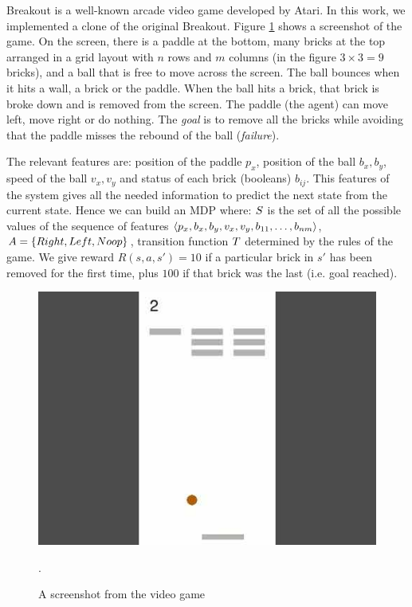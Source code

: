 \begin{example}\label{exa:breakout}
	Breakout is a well-known arcade video game developed by Atari. In this work, we implemented a clone of the original Breakout. Figure \ref{fig:breakout} shows a screenshot of the game. On the screen, there is a paddle at the bottom, many bricks at the top arranged in a grid layout with $n$ rows and $m$ columns (in the figure $3\times 3 = 9$ bricks), and a ball that is free to move across the screen. The ball bounces when it hits a wall, a brick or the paddle. When the ball hits a brick, that brick is broke down and is removed from the screen. The paddle (the agent) can move left, move right or do nothing. The \emph{goal} is to remove all the bricks while avoiding that the paddle misses the rebound of the ball (\emph{failure}).
	
	The relevant features are: position of the paddle $p_x$, position of the ball $b_x, b_y$, speed of the ball $v_x, v_y$ and status of each brick (booleans) $b_{ij}$. This features of the system gives all the needed information to predict the next state from the current state. Hence we can build an MDP where: $S$ is the set of  all the possible values of the sequence of features $\langle p_x, b_x, b_y, v_x, v_y, b_{11}, \dots, b_{nm} \rangle$, $A = \{Right, Left, No\-op\}$, transition function $T$ determined by the rules of the game. We give reward $R(s,a,s')=10$ if a particular brick in $s'$ has been removed for the first time, plus $100$ if that brick was the last (i.e. goal reached).
	\begin{figure}[h]
		\centering
		\includegraphics[width=.6\linewidth]{images/breakout.jpg}
		\caption{A screenshot from the video game \Breakout}\label{fig:breakout}. 
	\end{figure}

\end{example}
